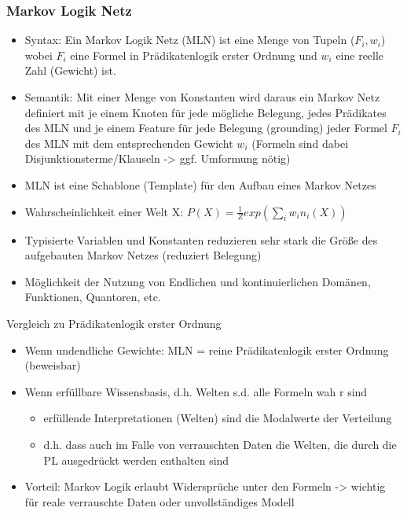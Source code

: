 \documentclass[paper=a4, fontsize=11pt]{scrartcl} %
\numberwithin{equation}{section} %
\numberwithin{figure}{section} %
\numberwithin{table}{section} %
\begin{document}
\subsubsection{Markov Logik Netz}

\begin{itemize}
\item Syntax: Ein Markov Logik Netz (MLN) ist eine Menge von Tupeln ($F_i,w_i$) wobei $F_i$ eine Formel in Prädikatenlogik erster Ordnung und $w_i$ eine reelle Zahl (Gewicht) ist.
\item Semantik: Mit einer Menge von Konstanten wird daraus ein Markov Netz definiert mit je einem Knoten für jede mögliche Belegung, jedes Prädikates des MLN und je einem Feature für jede Belegung (grounding) jeder Formel $F_i$ des MLN mit dem entsprechenden Gewicht $w_i$ (Formeln sind dabei Disjunktionsterme/Klauseln -> ggf. Umformung nötig)
\item MLN ist eine Schablone (Template) für den Aufbau eines Markov Netzes
\item Wahrscheinlichkeit einer Welt X: $P(X) = \frac{1}{Z} exp(\sum\limits_i w_i n_i(X))$
\item Typisierte Variablen und Konstanten reduzieren sehr stark die Größe des aufgebauten Markov Netzes (reduziert Belegung)
\item Möglichkeit der Nutzung von Endlichen und kontinuierlichen Domänen, Funktionen, Quantoren, etc.
\end{itemize}

Vergleich zu Prädikatenlogik erster Ordnung
\begin{itemize}
\item Wenn undendliche Gewichte: MLN = reine Prädikatenlogik erster Ordnung (beweisbar)
\item Wenn erfüllbare Wissensbasis, d.h. Welten s.d. alle Formeln wah r sind
\begin{itemize}
\item erfüllende Interpretationen (Welten) sind die Modalwerte der Verteilung
\item d.h. dass auch im Falle von verrauschten Daten die Welten, die durch die PL ausgedrückt werden enthalten sind
\end{itemize}
\item Vorteil: Markov Logik erlaubt Widersprüche unter den Formeln -> wichtig für reale verrauschte Daten oder unvollständiges Modell
\end{itemize}
\end{document}
